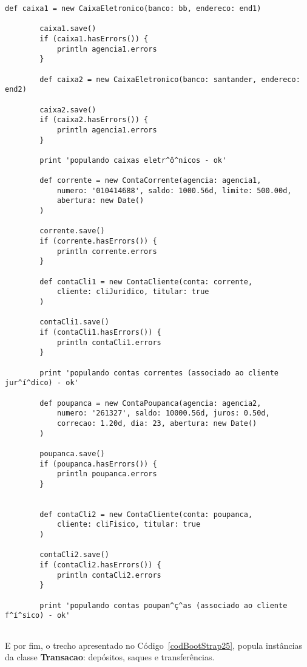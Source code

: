 \begin{lstlisting}[caption={\bf BootStrap.groovy (4)}, frame = trBL, float=htbp,
    label=codBootStrap24] 
        def caixa1 = new CaixaEletronico(banco: bb, endereco: end1)
        
        caixa1.save()
        if (caixa1.hasErrors()) {
            println agencia1.errors
        }
        
        def caixa2 = new CaixaEletronico(banco: santander, endereco: end2)
        
        caixa2.save()
        if (caixa2.hasErrors()) {
            println agencia1.errors
        }
        
        print 'populando caixas eletr^ô^nicos - ok'
 
        def corrente = new ContaCorrente(agencia: agencia1, 
            numero: '010414688', saldo: 1000.56d, limite: 500.00d,
            abertura: new Date()
        )
    
        corrente.save()
        if (corrente.hasErrors()) {
            println corrente.errors
        }

        def contaCli1 = new ContaCliente(conta: corrente, 
            cliente: cliJuridico, titular: true
        )
    
        contaCli1.save()
        if (contaCli1.hasErrors()) {
            println contaCli1.errors
        }
        
        print 'populando contas correntes (associado ao cliente jur^í^dico) - ok'
                
        def poupanca = new ContaPoupanca(agencia: agencia2, 
            numero: '261327', saldo: 10000.56d, juros: 0.50d,
            correcao: 1.20d, dia: 23, abertura: new Date()
        )
    
        poupanca.save()
        if (poupanca.hasErrors()) {
            println poupanca.errors
        }


        def contaCli2 = new ContaCliente(conta: poupanca, 
            cliente: cliFisico, titular: true
        )
    
        contaCli2.save()
        if (contaCli2.hasErrors()) {
            println contaCli2.errors
        }
        
        print 'populando contas poupan^ç^as (associado ao cliente f^í^sico) - ok'
        

\end{lstlisting}

\newpage

E por fim, o trecho apresentado no Código~\ref{codBootStrap25}, popula instâncias
da classe {\bf Transacao}: depósitos, saques e transferências.

